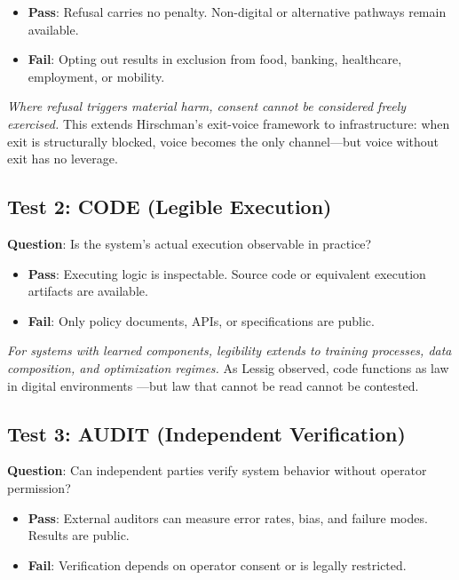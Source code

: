 \documentclass[11pt,a4paper]{article}
\begin{document}
\begin{itemize}
    \item \textbf{Pass}: Refusal carries no penalty. Non-digital or alternative pathways remain available.
    \item \textbf{Fail}: Opting out results in exclusion from food, banking, healthcare, employment, or mobility.
\end{itemize}

\textit{Where refusal triggers material harm, consent cannot be considered freely exercised.} This extends Hirschman's exit-voice framework \citep{hirschman1970} to infrastructure: when exit is structurally blocked, voice becomes the only channel---but voice without exit has no leverage.

\subsection{Test 2: CODE (Legible Execution)}

\textbf{Question}: Is the system's actual execution observable in practice?

\begin{itemize}
    \item \textbf{Pass}: Executing logic is inspectable. Source code or equivalent execution artifacts are available.
    \item \textbf{Fail}: Only policy documents, APIs, or specifications are public.
\end{itemize}

\textit{For systems with learned components, legibility extends to training processes, data composition, and optimization regimes.} As Lessig observed, code functions as law in digital environments \citep{lessig2006}---but law that cannot be read cannot be contested.

\subsection{Test 3: AUDIT (Independent Verification)}

\textbf{Question}: Can independent parties verify system behavior without operator permission?

\begin{itemize}
    \item \textbf{Pass}: External auditors can measure error rates, bias, and failure modes. Results are public.
    \item \textbf{Fail}: Verification depends on operator consent or is legally restricted.
\end{itemize}
\end{document}
